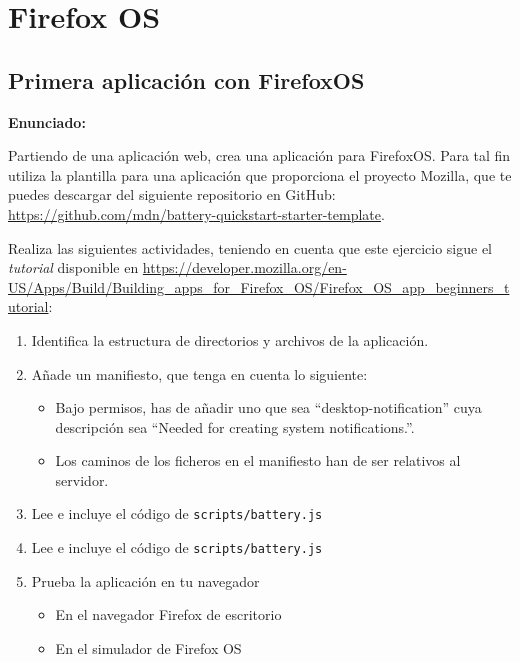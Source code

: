 \section{Firefox OS}

\subsection{Primera aplicación con FirefoxOS}
\label{subsec:app-firefoxos}

\textbf{Enunciado:}

Partiendo de una aplicación web, crea una aplicación para FirefoxOS. Para tal
fin utiliza la plantilla para una aplicación que proporciona el proyecto Mozilla,
que te puedes descargar del siguiente repositorio en GitHub: \\
\url{https://github.com/mdn/battery-quickstart-starter-template}.

Realiza las siguientes actividades, teniendo en cuenta que este ejercicio sigue el
\emph{tutorial} disponible en \url{https://developer.mozilla.org/en-US/Apps/Build/Building_apps_for_Firefox_OS/Firefox_OS_app_beginners_tutorial}:

\begin{enumerate}
  \item Identifica la estructura de directorios y archivos de la aplicación.
  \item Añade un manifiesto, que tenga en cuenta lo siguiente:
  \begin{itemize}
    \item Bajo permisos, has de añadir uno que sea ``desktop-notification'' cuya descripción sea ``Needed for creating system notifications.''.
    \item Los caminos de los ficheros en el manifiesto han de ser relativos al servidor.
  \end{itemize}
  \item Lee e incluye el código de \texttt{scripts/battery.js}
  \item Lee e incluye el código de \texttt{scripts/battery.js}
  \item Prueba la aplicación en tu navegador
  \begin{itemize}
    \item En el navegador Firefox de escritorio
    \item En el simulador de Firefox OS
  \end{itemize}
\end{enumerate}

